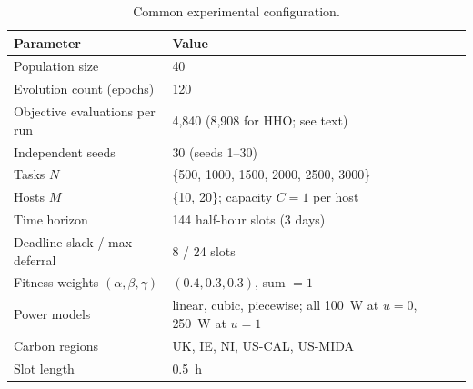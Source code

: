 \documentclass[12pt,a4paper]{article}
\providecommand{\DIFaddbegin}{} %
\providecommand{\DIFaddend}{} %
\providecommand{\DIFdelbegin}{} %
\providecommand{\DIFdelend}{} %
\providecommand{\DIFscaledelfig}{0.5}
\newlength{\DIFdelgraphicswidth} %
\newlength{\DIFdelgraphicsheight} %
\providecommand{\DIFaddincludegraphics}[2][]{{\color{blue}\fbox{\DIFOincludegraphics[#1]{#2}}}} %
\providecommand{\DIFdelincludegraphics}[2][]{%
\sbox{\DIFdelgraphicsbox}{\DIFOincludegraphics[#1]{#2}}%
\settoboxwidth{\DIFdelgraphicswidth}{\DIFdelgraphicsbox} %
\settoboxtotalheight{\DIFdelgraphicsheight}{\DIFdelgraphicsbox} %
\scalebox{\DIFscaledelfig}{%
\parbox[b]{\DIFdelgraphicswidth}{\usebox{\DIFdelgraphicsbox}\\[-\baselineskip] \rule{\DIFdelgraphicswidth}{0em}}\llap{\resizebox{\DIFdelgraphicswidth}{\DIFdelgraphicsheight}{%
\setlength{\unitlength}{\DIFdelgraphicswidth}%
\begin{picture}(1,1)%
\thicklines\linethickness{2pt} %
{\color[rgb]{1,0,0}\put(0,0){\framebox(1,1){}}}%
{\color[rgb]{1,0,0}\put(0,0){\line( 1,1){1}}}%
{\color[rgb]{1,0,0}\put(0,1){\line(1,-1){1}}}%
\end{picture}%
}\hspace*{3pt}}} %
} %
\DeclareRobustCommand{\DIFaddbegin}{\DIFOaddbegin \let\includegraphics\DIFaddincludegraphics} %
\DeclareRobustCommand{\DIFaddend}{\DIFOaddend \let\includegraphics\DIFOincludegraphics} %
\DeclareRobustCommand{\DIFdelbegin}{\DIFOdelbegin \let\includegraphics\DIFdelincludegraphics} %
\DeclareRobustCommand{\DIFdelend}{\DIFOaddend \let\includegraphics\DIFOincludegraphics} %
\begin{document}
\DIFdelbegin %
\DIFdelend \DIFaddbegin \begin{table}[H]\centering \footnotesize
\caption{Common experimental configuration.}\label{tab:config}
\begin{tabular}{@{}ll@{}}
\toprule Parameter & Value \\ \midrule
Population size & 40 \\
Evolution count (epochs) & 120 \\
Objective evaluations per run & 4{,}840 (8{,}908 for HHO; see text) \\
Independent seeds & 30 (seeds 1--30) \\
Tasks $N$ & \{500, 1000, 1500, 2000, 2500, 3000\} \\
Hosts $M$ & \{10, 20\}; capacity $C=1$ per host \\
Time horizon & 144 half-hour slots (3 days) \\
Deadline slack / max deferral & 8 / 24 slots \\
Fitness weights $(\alpha,\beta,\gamma)$ & $(0.4, 0.3, 0.3)$, sum $=1$ \\
Power models & linear, cubic, piecewise; all 100~W at $u{=}0$, 250~W at $u{=}1$ \\
Carbon regions & UK, IE, NI, US-CAL, US-MIDA \\
Slot length & 0.5~h \\
\bottomrule
\end{tabular}
\end{table}
\DIFaddend 
\end{document}
